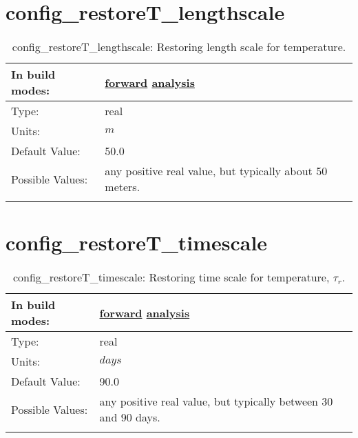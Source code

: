 \section[config\_restoreT\_lengthscale]{config\_restoreT\_lengthscale}
\label{sec:nm_sec_config_restoreT_lengthscale}
\begin{center}
\begin{longtable}{| p{2.0in} || p{4.0in} |}
    \hline
    In build modes: & \hyperref[subsec:forward_nm_tab_forcing]{forward} \hyperref[subsec:analysis_nm_tab_forcing]{analysis} \\
    \hline
    Type: & real \\
    \hline
    Units: & $m$ \\
    \hline
    Default Value: & 50.0 \\
    \hline
    Possible Values: & any positive real value, but typically about 50 meters. \\
    \hline
    \caption{config\_restoreT\_lengthscale: Restoring length scale for temperature.}
\end{longtable}
\end{center}
\section[config\_restoreT\_timescale]{config\_restoreT\_timescale}
\label{sec:nm_sec_config_restoreT_timescale}
\begin{center}
\begin{longtable}{| p{2.0in} || p{4.0in} |}
    \hline
    In build modes: & \hyperref[subsec:forward_nm_tab_forcing]{forward} \hyperref[subsec:analysis_nm_tab_forcing]{analysis} \\
    \hline
    Type: & real \\
    \hline
    Units: & $days$ \\
    \hline
    Default Value: & 90.0 \\
    \hline
    Possible Values: & any positive real value, but typically between 30 and 90 days. \\
    \hline
    \caption{config\_restoreT\_timescale:  Restoring time scale for temperature,  $\tau_r.$ }
\end{longtable}
\end{center}
